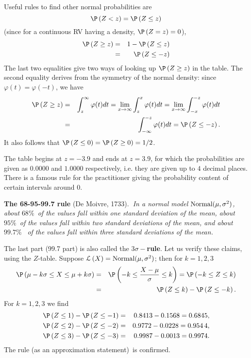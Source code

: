 Useful rules to find other normal probabilities are 
\begin{equation*}
\P \left( Z<z\right) =\P \left( Z\leq z\right)
\end{equation*}%
(since for a continuous RV having a density, $\P \left( Z=z\right) =0$), 
\begin{eqnarray*}
\P \left( Z\geq z\right) &=&1-\P \left( Z\leq z\right) \\
&=&\P \left( Z\leq -z\right)
\end{eqnarray*}%
The last two equalities give two ways of looking up $\P \left( Z\geq
z\right) $ in the table. The second equality derives from the symmetry of
the normal density: since $\varphi (t)=\varphi (-t)$, we have 
\begin{eqnarray*}
\P \left( Z\geq z\right) &=&\int_{z}^{\infty }\varphi
(t)dt=\lim_{x\rightarrow \infty }\int_{z}^{x}\varphi
(t)dt=\lim_{x\rightarrow \infty }\int_{-x}^{-z}\varphi (t)dt \\
&=&\int_{-\infty }^{-z}\varphi (t)dt=\P \left( Z\leq -z\right) .
\end{eqnarray*}%
It also follows that $\P \left( Z\leq 0\right) =\P \left( Z\geq 0\right)
=1/2$.

The table begins at $z=-3.9$ and ends at $z=3.9$, for which the
probabilities are given as $0.0000$ and $1$.$0000$ respectively, i.e. they
are given up to $4$ decimal places. There is a famous rule for the
practitioner giving the probability content of certain intervals around $0.$

\bigskip

\textbf{The 68-95-99.7 rule }(De Moivre, 1733).\textbf{\ }\emph{In a normal
model }$\mbox{{\rm Normal}}(\mu ,\sigma ^{2})$\emph{, about }$68\%$\emph{\ of the values fall
within one standard deviation of the mean, about }$95\%$\emph{\ of the
values fall within two standard deviations of the mean, and about }$99.7\%$%
\emph{\ of the values fall within three standard deviations of the mean.}%
\bigskip\ 

The last part (99.7 part) is also called the $3\sigma -$\textbf{rule}. Let
us verify these claims, using the $Z$-table. Suppose $\mathcal{L}\left(
X\right) =\mbox{{\rm Normal}}(\mu ,\sigma ^{2})$; then for $k=1,2,3$ 
\begin{eqnarray*}
\P \left( \mu -k\sigma \leq X\leq \mu +k\sigma \right) &=&\P \left( -k\leq 
\frac{X-\mu }{\sigma }\leq k\right) =\P \left( -k\leq Z\leq k\right) \\
&=&\P \left( Z\leq k\right) -\P \left( Z\leq -k\right) .
\end{eqnarray*}%
For $k=1,2,3$ we find 
\begin{eqnarray*}
\P \left( Z\leq 1\right) -\P \left( Z\leq -1\right)
&=&0.8413-0.1568=0.6845, \\
\P \left( Z\leq 2\right) -\P \left( Z\leq -2\right)
&=&0.9772-0.0228=0.954\,4, \\
\P \left( Z\leq 3\right) -\P \left( Z\leq -3\right)
&=&0.9987-0.0013=0.9974.
\end{eqnarray*}%
The rule (as an approximation statement)\ is confirmed. \bigskip

